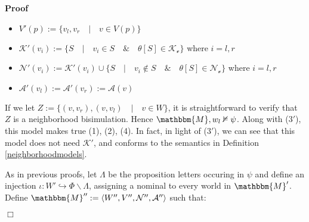 \documentclass{article}
\newcommand{\assign}{:=}
\newcommand{\nin}{\not\in}
\newenvironment{itemizedot}{\begin{itemize} \renewcommand{\labelitemi}{$\bullet$}\renewcommand{\labelitemii}{$\bullet$}\renewcommand{\labelitemiii}{$\bullet$}\renewcommand{\labelitemiv}{$\bullet$}}{\end{itemize}}
\newenvironment{proof}{\noindent\textbf{Proof\ }}{\hspace*{\fill}$\Box$\medskip}
\begin{document}
\begin{proof}
\begin{itemizedot}
    \item $V' (p) \assign \{v_l, v_r \hspace{1em} | \hspace{1em} v \in V
    (p)\}$
    
    \item $\mathcal{K}' (v_i) \assign \{S \hspace{1em} | \hspace{1em} v_i \in
    S \hspace{1em} \& \hspace{1em} \theta [S] \in \mathcal{K_v} \}$ where $i =
    l, r$
    
    \item $\mathcal{N}' (v_i) \assign \mathcal{K}' (v_i) \cup \{S \hspace{1em}
    | \hspace{1em} v_i \nin S \hspace{1em} \& \hspace{1em} \theta [S] \in
    \mathcal{N_v} \}$ where $i = l, r$
    
    \item $\mathcal{A}' (v_l) \assign \mathcal{A}' (v_r) \assign \mathcal{A}
    (v)$
  \end{itemizedot}
  
  
  If we let $Z \assign \{(v, v_r), (v, v_l) \hspace{1em} | \hspace{1em} v \in
  W\}$, it is straightforward to verify that $Z$ is a neighborhood
  bisimulation.  Hence $\mathbbm{M}, w_l \nvDash \psi$.  Along with (3$'$),
  this model makes true (1), (2), (4).  In fact, in light of ($3'$), we can
  see that this model does not need $\mathcal{K}'$, and conforms to the
  semantics in Definition \ref{neighborhoodmodels}.{\hspace*{\fill}}
  
  
  
  As in previous proofs, let $\Lambda$ be the proposition letters occuring in
  $\psi$ and define an injection $\iota : W' \hookrightarrow \Phi \backslash
  \Lambda$, assigning a nominal to every world in $\mathbbm{M}'$.  Define
  $\mathbbm{M}'' \assign \langle W'', V'', \mathcal{N}'', \mathcal{A}''
  \rangle$ such that:
  
  
  

\end{proof}
\end{document}

